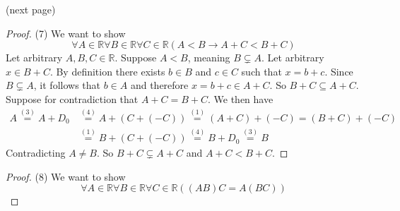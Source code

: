 \documentclass{report}
\begin{document}
\noindent(next page)\newpage
\begin{proof}(7)
We want to show
\begin{equation*}
\forall A\in\mathbb R\forall B\in\mathbb R\forall C\in\mathbb R(
A<B\to A+C<B+C)
\end{equation*}
Let arbitrary $A,B,C\in\mathbb R$. Suppose $A<B$, meaning $B\subsetneq A$.
Let arbitrary $x\in B+C$. By definition there exists $b\in B$ and $c\in C$ such that $x=b+c$. 
Since $B\subsetneq A$, it follows that $b\in A$ and therefore $x=b+c\in A+C$. So $B+C\subseteq A+C$.\\
\indent Suppose for contradiction that $A+C=B+C$. We then have
\begin{align*}
A\overset{(3)}{=}A+D_0&\overset{(4)}{=}A+(C+(-C))\overset{(1)}{=}(A+C)+(-C)=(B+C)+(-C)\\
&\overset{(1)}{=}B+(C+(-C))\overset{(4)}{=}B+D_0\overset{(3)}{=}B
\end{align*}
Contradicting $A\neq B$. So $B+C\subsetneq A+C$ and $A+C<B+C$.
\end{proof}
\begin{proof}(8)
We want to show
\begin{equation*}
\forall A\in\mathbb R\forall B\in\mathbb R\forall C\in\mathbb R((AB)C=A(BC))
\end{equation*}



\end{proof}
\end{document}
